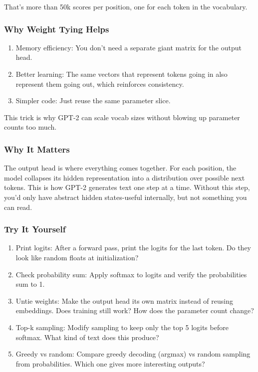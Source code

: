 \documentclass[
  letterpaper,
  DIV=11,
  numbers=noendperiod]{scrreprt}
\providecommand{\tightlist}{%
  \setlength{\itemsep}{0pt}\setlength{\parskip}{0pt}}
\begin{document}
That's more than 50k scores per position, one for each token in the
vocabulary.

\subsubsection{Why Weight Tying Helps}\label{why-weight-tying-helps}

\begin{enumerate}
\def\labelenumi{\arabic{enumi}.}
\tightlist
\item
  Memory efficiency: You don't need a separate giant matrix for the
  output head.
\item
  Better learning: The same vectors that represent tokens going in also
  represent them going out, which reinforces consistency.
\item
  Simpler code: Just reuse the same parameter slice.
\end{enumerate}

This trick is why GPT-2 can scale vocab sizes without blowing up
parameter counts too much.

\subsubsection{Why It Matters}\label{why-it-matters-16}

The output head is where everything comes together. For each position,
the model collapses its hidden representation into a distribution over
possible next tokens. This is how GPT-2 generates text one step at a
time. Without this step, you'd only have abstract hidden states-useful
internally, but not something you can read.

\subsubsection{Try It Yourself}\label{try-it-yourself-18}

\begin{enumerate}
\def\labelenumi{\arabic{enumi}.}
\tightlist
\item
  Print logits: After a forward pass, print the logits for the last
  token. Do they look like random floats at initialization?
\item
  Check probability sum: Apply softmax to logits and verify the
  probabilities sum to 1.
\item
  Untie weights: Make the output head its own matrix instead of reusing
  embeddings. Does training still work? How does the parameter count
  change?
\item
  Top-k sampling: Modify sampling to keep only the top 5 logits before
  softmax. What kind of text does this produce?
\item
  Greedy vs random: Compare greedy decoding (argmax) vs random sampling
  from probabilities. Which one gives more interesting outputs?
\end{enumerate}
\end{document}
